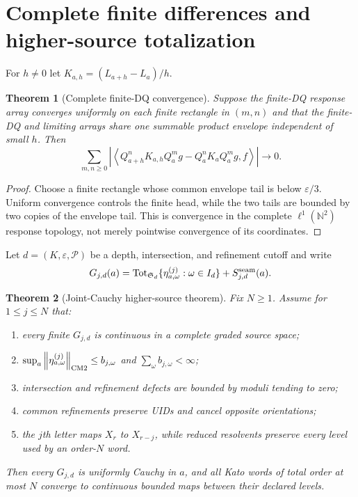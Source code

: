 \documentclass[11pt,reqno]{amsart}
\newtheorem{theorem}{Theorem}[section]
\theoremstyle{definition}
\theoremstyle{remark}
\newcommand{\N}{\mathbb N}
\newcommand{\Tot}{\operatorname{Tot}}
\newcommand{\norm}[1]{\left\lVert #1\right\rVert}
\newcommand{\abs}[1]{\left\lvert #1\right\rvert}
\newcommand{\pair}[2]{\left\langle #1,#2\right\rangle}
\begin{document}
\section{Complete finite differences and higher-source totalization}

For $h\ne0$ let $K_{a,h}=(L_{a+h}-L_a)/h$.

\begin{theorem}[Complete finite-DQ convergence]\label{thm:fdq}
Suppose the finite-DQ response array converges uniformly on each finite
rectangle in $(m,n)$ and that the finite-DQ and limiting arrays share one
summable product envelope independent of small $h$.  Then
\begin{equation}\label{eq:fdq}
 \sum_{m,n\ge0}
 \abs{\pair{Q_{a+h}^nK_{a,h}Q_a^m g-Q_a^nK_aQ_a^m g}{f}}
 \longrightarrow0.
\end{equation}
\end{theorem}

\begin{proof}
Choose a finite rectangle whose common envelope tail is below
$\varepsilon/3$.  Uniform convergence controls the finite head, while the two
tails are bounded by two copies of the envelope tail.  This is convergence in
the complete $\ell^1(\N^2)$ response topology, not merely pointwise
convergence of its coordinates.
\end{proof}

Let $d=(K,\varepsilon,\mathcal P)$ be a depth, intersection, and refinement
cutoff and write
\[
 G_{j,d}(a)=\Tot_{\mathfrak S_d}
 \{\eta^{(j)}_{a,\omega}:\omega\in I_d\}+S_{j,d}^{\rm seam}(a).
\]

\begin{theorem}[Joint-Cauchy higher-source theorem]\label{thm:totalization}
Fix $N\ge1$.  Assume for $1\le j\le N$ that:
\begin{enumerate}[label=(\roman*)]
\item every finite $G_{j,d}$ is continuous in a complete graded source space;
\item $\sup_a\norm{\eta^{(j)}_{a,\omega}}_{\rm CM2}\le b_{j,\omega}$ and
$\sum_\omega b_{j,\omega}<\infty$;
\item intersection and refinement defects are bounded by moduli tending to
zero;
\item common refinements preserve UIDs and cancel opposite orientations;
\item the $j$th letter maps $X_r$ to $X_{r-j}$, while reduced resolvents
preserve every level used by an order-$N$ word.
\end{enumerate}
Then every $G_{j,d}$ is uniformly Cauchy in $a$, and all Kato words of total
order at most $N$ converge to continuous bounded maps between their declared
levels.
\end{theorem}
\end{document}
